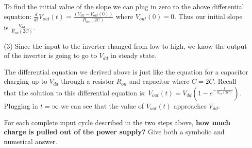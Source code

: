 \begin{enumerate}
{To find the initial value of the slope we can plug in zero to the above differential equation: $\frac {d}{dt} V_{out} (t) = \frac {(V_{dd} - V_{out} (0))}{R_{on} (2C)}$ where $V_{out} (0) = 0$.
Thus our initial slope is $\frac {V_{dd}} {R_{on} (2C)}$.


(3) Since the input to the inverter changed from low to high, we know the output of the inverter is going to go to $V_{dd}$ in steady state.

The differential equation we derived above is just like the equation for a capacitor charging up to $V_{dd}$ through a resistor $R_{on}$ and capacitor where $C = 2C$.
Recall that the solution to this differential equation is: $V_{out}(t) = V_{dd}(1 - e^{- \frac {t}{R_{on} (2C)}})$.
Plugging in $t = \infty$ we can see that the value of $V_{out}(t)$ approaches $V_{dd}$.

  
}

\qitem For each complete input cycle described in the two steps above, \textbf{how much charge is pulled out of the power supply?}
Give both a symbolic and numerical answer.


\end{enumerate}

